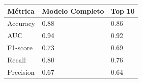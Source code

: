 \begin{tabular}{lll}
\toprule
Métrica & Modelo Completo & Top 10 \\
\midrule
Accuracy & 0.88 & 0.86 \\
AUC & 0.94 & 0.92 \\
F1-score & 0.73 & 0.69 \\
Recall & 0.80 & 0.76 \\
Precision & 0.67 & 0.64 \\
\bottomrule
\end{tabular}
